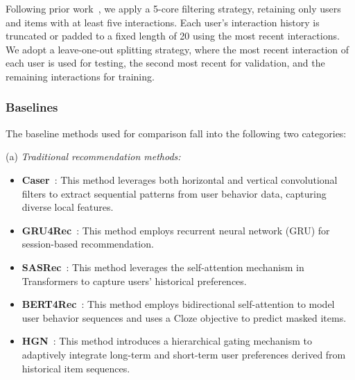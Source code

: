 Following prior work~\cite{SASRec, TIGER}, we apply a 5-core filtering strategy, retaining only users and items with at least five interactions. Each user’s interaction history is truncated or padded to a fixed length of 20 using the most recent interactions. We adopt a leave-one-out splitting strategy, where the most recent interaction of each user is used for testing, the second most recent for validation, and the remaining interactions for training.

\subsubsection{Baselines}
\label{sec:exp_baselines}

The baseline methods used for comparison fall into the following two categories:

\vspace{+3pt}
(a) \noindent\textit{Traditional recommendation methods:}
\begin{itemize}[leftmargin=*]
    \item \textbf{Caser}~\cite{Caser}: This method leverages both horizontal and vertical convolutional filters to extract sequential patterns from user behavior data, capturing diverse local features.
    \item \textbf{GRU4Rec}~\cite{GRU4Rec}: This method employs recurrent neural network (GRU) for session-based recommendation.
    \item \textbf{SASRec}~\cite{SASRec}: This method leverages the self-attention mechanism in Transformers to capture users’ historical preferences.
    \item \textbf{BERT4Rec}~\cite{BERT4Rec}: This method employs bidirectional self-attention to model user behavior sequences and uses a Cloze objective to predict masked items. 
    \item \textbf{HGN}~\cite{HGN}: This method introduces a hierarchical gating mechanism to adaptively integrate long-term and short-term user preferences derived from historical item sequences.
\end{itemize}

